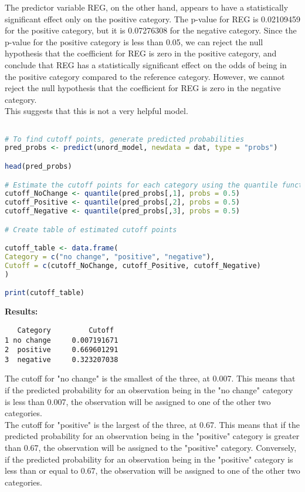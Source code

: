 \documentclass[12pt,letterpaper]{article}
\begin{document}
\begin{enumerate}
\noindent The predictor variable REG, on the other hand, appears to have a statistically significant effect only on the positive category. The p-value for REG is 0.02109459 for the positive category, but it is 0.07276308 for the negative category. Since the p-value for the positive category is less than 0.05, we can reject the null hypothesis that the coefficient for REG is zero in the positive category, and conclude that REG has a statistically significant effect on the odds of being in the positive category compared to the reference category. However, we cannot reject the null hypothesis that the coefficient for REG is zero in the negative category.\\

\noindent This suggests that this is not a very helpful model.

\begin{lstlisting}[language = R]

# To find cutoff points, generate predicted probabilities
pred_probs <- predict(unord_model, newdata = dat, type = "probs")

head(pred_probs)

# Estimate the cutoff points for each category using the quantile function
cutoff_NoChange <- quantile(pred_probs[,1], probs = 0.5)
cutoff_Positive <- quantile(pred_probs[,2], probs = 0.5)
cutoff_Negative <- quantile(pred_probs[,3], probs = 0.5)

# Create table of estimated cutoff points

cutoff_table <- data.frame(
Category = c("no change", "positive", "negative"),
Cutoff = c(cutoff_NoChange, cutoff_Positive, cutoff_Negative)
)

print(cutoff_table)
\end{lstlisting}

	
\noindent \textbf{Results:}
\begin{verbatim}
   Category      	Cutoff
1 no change 	0.007191671
2  positive 	0.669601291
3  negative 	0.323207038
\end{verbatim}
	
	\noindent The cutoff for "no change" is the smallest of the three, at 0.007. This means that if the predicted probability for an observation being in the "no change" category is less than 0.007, the observation will be assigned to one of the other two categories.\\
	
	\noindent The cutoff for "positive" is the largest of the three, at 0.67. This means that if the predicted probability for an observation being in the "positive" category is greater than 0.67, the observation will be assigned to the "positive" category. Conversely, if the predicted probability for an observation being in the "positive" category is less than or equal to 0.67, the observation will be assigned to one of the other two categories.\\
	

\end{enumerate}
\end{document}

